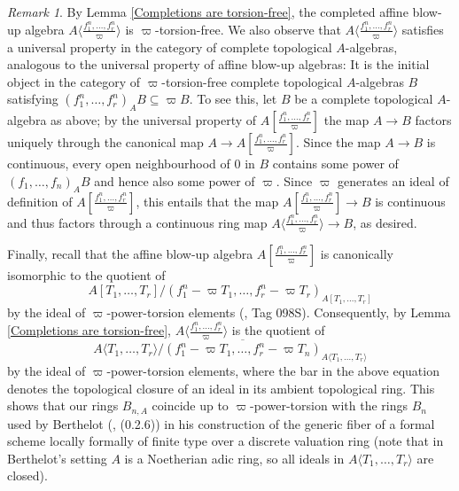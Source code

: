 \documentclass[12pt,twoside,a4paper]{article}
\theoremstyle{definition}
\theoremstyle{remark}
\newtheorem{rmk}[thm]{Remark}
\begin{document}
\begin{rmk}
By Lemma \ref{Completions are torsion-free}, the completed affine blow-up algebra $A\langle\frac{f_1^{n},\dots, f_r^{n}}{\varpi}\rangle$ is $\varpi$-torsion-free. We also observe that $A\langle\frac{f_1^{n},\dots,f_r^{n}}{\varpi}\rangle$ satisfies a universal property in the category of complete topological $A$-algebras, analogous to the universal property of affine blow-up algebras: It is the initial object in the category of $\varpi$-torsion-free complete topological $A$-algebras $B$ satisfying $(f_{1}^{n},\dots, f_{r}^{n})_{A}B\subseteq\varpi B$. To see this, let $B$ be a complete topological $A$-algebra as above; by the universal property of $A[\frac{f_1^{n},\dots, f_r^{n}}{\varpi}]$ the map $A\to B$ factors uniquely through the canonical map $A\to A[\frac{f_1^{n},\dots,f_r^{n}}{\varpi}]$. Since the map $A\to B$ is continuous, every open neighbourhood of $0$ in $B$ contains some power of $(f_1,\dots, f_n)_{A}B$ and hence also some power of $\varpi$. Since $\varpi$ generates an ideal of definition of $A[\frac{f_1^{n},\dots,f_r^{n}}{\varpi}]$, this entails that the map $A[\frac{f_1^{n},\dots,f_r^{n}}{\varpi}]\to B$ is continuous and thus factors through a continuous ring map $A\langle\frac{f_1^{n},\dots,f_r^{n}}{\varpi}\rangle\to B$, as desired.     

Finally, recall that the affine blow-up algebra $A[\frac{f_1^{n},\dots,f_r^{n}}{\varpi}]$ is canonically isomorphic to the quotient of \begin{equation*}A[T_1,\dots,T_r]/(f_1^{n}-\varpi T_1,\dots,f_r^{n}-\varpi T_r)_{A[T_1,\dots,T_r]}\end{equation*}by the ideal of $\varpi$-power-torsion elements (\cite{Stacks}, Tag 098S). Consequently, by Lemma \ref{Completions are torsion-free}, $A\langle\frac{f_1^{n},\dots,f_r^{n}}{\varpi}\rangle$ is the quotient of \begin{equation*}A\langle T_1,\dots,T_r\rangle/\overline{(f_1^{n}-\varpi T_1,\dots, f_r^{n}-\varpi T_n)}_{A\langle T_1,\dots,T_r\rangle}\end{equation*}by the ideal of $\varpi$-power-torsion elements, where the bar in the above equation denotes the topological closure of an ideal in its ambient topological ring. This shows that our rings $B_{n,A}$ coincide up to $\varpi$-power-torsion with the rings $B_{n}$ used by Berthelot (\cite{Berthelot96}, (0.2.6)) in his construction of the generic fiber of a formal scheme locally formally of finite type over a discrete valuation ring (note that in Berthelot's setting $A$ is a Noetherian adic ring, so all ideals in $A\langle T_1,\dots, T_r\rangle$ are closed).\end{rmk}
\end{document}

